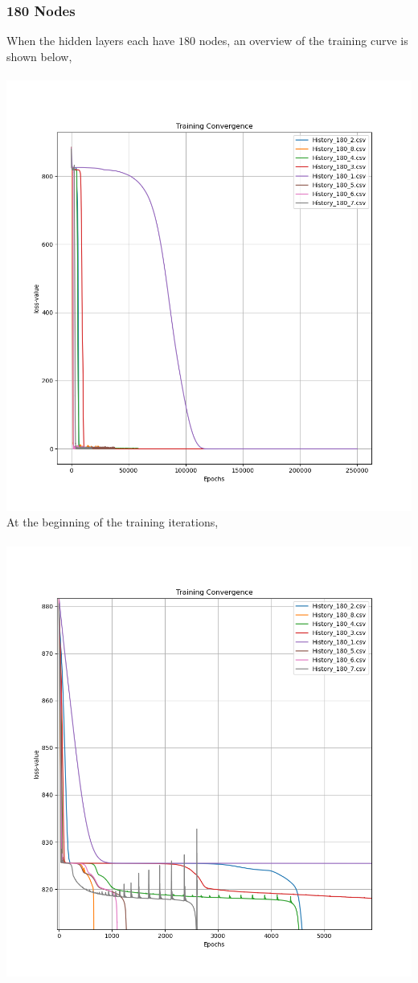\documentclass[a4paper, 12pt]{report}
\def\size{0.75}
\begin{document}
\begin{center}
\subsubsection{180 Nodes}
When the hidden layers each have $180$ nodes, an overview of the training curve is shown below,
\\~\\\includegraphics[scale=\size]{Width_180_Overview.png}
\newpage
At the beginning of the training iterations,
\\~\\\includegraphics[scale=\size]{Width_180_Beginning.png}

\end{center}
\end{document}
